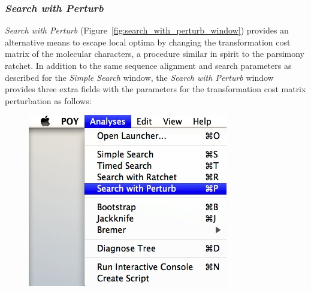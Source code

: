 {\subsubsection*{\emph{Search with Perturb}}

\emph{Search with Perturb} (Figure~\ref{fig:search_with_perturb_window}) provides an alternative means to escape local 
optima by changing the transformation cost matrix of the molecular characters, a procedure similar in spirit to the parsimony 
ratchet. In addition to the same sequence alignment and search parameters as described for the \emph{Simple Search} 
window, the \emph{Search with Perturb} window provides three extra fields with the parameters for the
transformation cost matrix perturbation as follows:

\begin{figure}
\centering
\begin{minipage}[c]{0.45\textwidth}
   		\includegraphics[width=\textwidth]{doc/figures/searchwithperturb_menu.jpg}
\end{minipage}
\,
\begin{minipage}[c]{0.52\textwidth}

\end{minipage}
\end{figure}}
